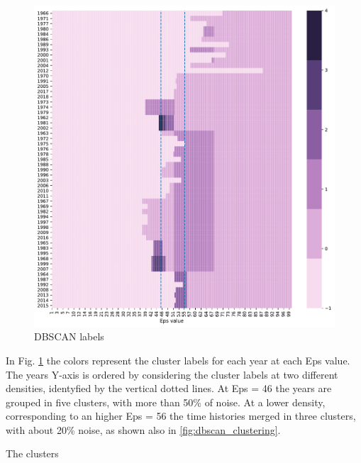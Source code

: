 \documentclass[a4paper,11pt,final]{article}
\begin{document}
\begin{figure}[htpb]
\center
\includegraphics[width= \linewidth]{figures/report_DBSCAN_labels_1.pdf}
\caption{DBSCAN labels}
\label{fig:DBSCAN_labels}
\end{figure}


In Fig. \ref{fig:DBSCAN_labels} the colors represent the cluster labels for each year at each Eps value. The years Y-axis is ordered by considering the cluster labels at two different densities, identyfied by the vertical dotted lines. 
At Eps = 46 the years are grouped in five clusters, with more than 50\% of noise. At a lower density, corresponding to an higher Eps = 56 the time histories merged in three clusters, with about 20\% noise, as shown also in \ref{fig:dbscan_clustering}. 

The clusters 
\end{document}
